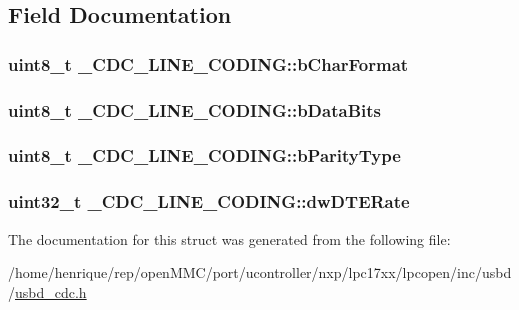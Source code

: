 \subsection{Field Documentation}
\hypertarget{struct__CDC__LINE__CODING_a5c0251985f51927746b57e4c800ae9c7}{
\subsubsection[{b\-Char\-Format}]{\setlength{\rightskip}{0pt plus 5cm}uint8\-\_\-t \-\_\-\-C\-D\-C\-\_\-\-L\-I\-N\-E\-\_\-\-C\-O\-D\-I\-N\-G\-::b\-Char\-Format}}\label{struct__CDC__LINE__CODING_a5c0251985f51927746b57e4c800ae9c7}
\hypertarget{struct__CDC__LINE__CODING_a6764726aafd5b442bf5a1ecb39ffeb96}{
\subsubsection[{b\-Data\-Bits}]{\setlength{\rightskip}{0pt plus 5cm}uint8\-\_\-t \-\_\-\-C\-D\-C\-\_\-\-L\-I\-N\-E\-\_\-\-C\-O\-D\-I\-N\-G\-::b\-Data\-Bits}}\label{struct__CDC__LINE__CODING_a6764726aafd5b442bf5a1ecb39ffeb96}
\hypertarget{struct__CDC__LINE__CODING_a737b276dd2599610b3cf4783c80e725c}{
\subsubsection[{b\-Parity\-Type}]{\setlength{\rightskip}{0pt plus 5cm}uint8\-\_\-t \-\_\-\-C\-D\-C\-\_\-\-L\-I\-N\-E\-\_\-\-C\-O\-D\-I\-N\-G\-::b\-Parity\-Type}}\label{struct__CDC__LINE__CODING_a737b276dd2599610b3cf4783c80e725c}
\hypertarget{struct__CDC__LINE__CODING_aeca9d053bfd185bc6b70911197442398}{
\subsubsection[{dw\-D\-T\-E\-Rate}]{\setlength{\rightskip}{0pt plus 5cm}uint32\-\_\-t \-\_\-\-C\-D\-C\-\_\-\-L\-I\-N\-E\-\_\-\-C\-O\-D\-I\-N\-G\-::dw\-D\-T\-E\-Rate}}\label{struct__CDC__LINE__CODING_aeca9d053bfd185bc6b70911197442398}


The documentation for this struct was generated from the following file\-:\begin{DoxyCompactItemize}
\item 
/home/henrique/rep/open\-M\-M\-C/port/ucontroller/nxp/lpc17xx/lpcopen/inc/usbd/\hyperlink{usbd__cdc_8h}{usbd\-\_\-cdc.\-h}\end{DoxyCompactItemize}
